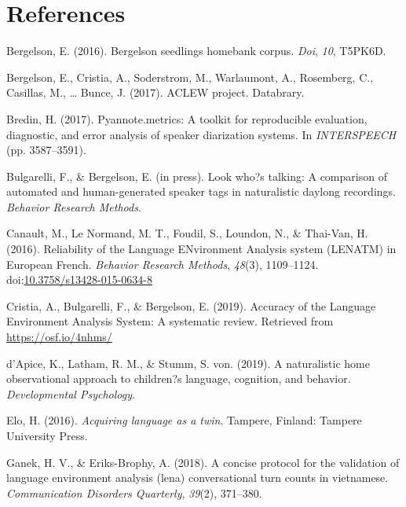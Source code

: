\documentclass[english,floatsintext,man]{apa6}
\begin{document}
\newpage

\section{References}\label{references}

\setlength{\parindent}{-0.5in} \setlength{\leftskip}{0.5in}

\hypertarget{refs}{}
\hypertarget{ref-bergelson2016bergelson}{}
Bergelson, E. (2016). Bergelson seedlings homebank corpus. \emph{Doi},
\emph{10}, T5PK6D.

\hypertarget{ref-bergelson2017}{}
Bergelson, E., Cristia, A., Soderstrom, M., Warlaumont, A., Rosemberg,
C., Casillas, M., \ldots{} Bunce, J. (2017). ACLEW project. Databrary.

\hypertarget{ref-bredin2017pyannote}{}
Bredin, H. (2017). Pyannote.metrics: A toolkit for reproducible
evaluation, diagnostic, and error analysis of speaker diarization
systems. In \emph{INTERSPEECH} (pp. 3587--3591).

\hypertarget{ref-bulgarelli2019}{}
Bulgarelli, F., \& Bergelson, E. (in press). Look who?s talking: A
comparison of automated and human-generated speaker tags in naturalistic
daylong recordings. \emph{Behavior Research Methods}.

\hypertarget{ref-Canault2016}{}
Canault, M., Le Normand, M. T., Foudil, S., Loundon, N., \& Thai-Van, H.
(2016). Reliability of the Language ENvironment Analysis system (LENATM)
in European French. \emph{Behavior Research Methods}, \emph{48}(3),
1109--1124.
doi:\href{https://doi.org/10.3758/s13428-015-0634-8}{10.3758/s13428-015-0634-8}

\hypertarget{ref-Cristia}{}
Cristia, A., Bulgarelli, F., \& Bergelson, E. (2019). Accuracy of the
Language Environment Analysis System: A systematic review. Retrieved
from \url{https://osf.io/4nhms/}

\hypertarget{ref-d2019naturalistic}{}
d'Apice, K., Latham, R. M., \& Stumm, S. von. (2019). A naturalistic
home observational approach to children?s language, cognition, and
behavior. \emph{Developmental Psychology}.

\hypertarget{ref-Elo}{}
Elo, H. (2016). \emph{Acquiring language as a twin}. Tampere, Finland:
Tampere University Press.

\hypertarget{ref-ganek2018concise}{}
Ganek, H. V., \& Eriks-Brophy, A. (2018). A concise protocol for the
validation of language environment analysis (lena) conversational turn
counts in vietnamese. \emph{Communication Disorders Quarterly},
\emph{39}(2), 371--380.
\end{document}
